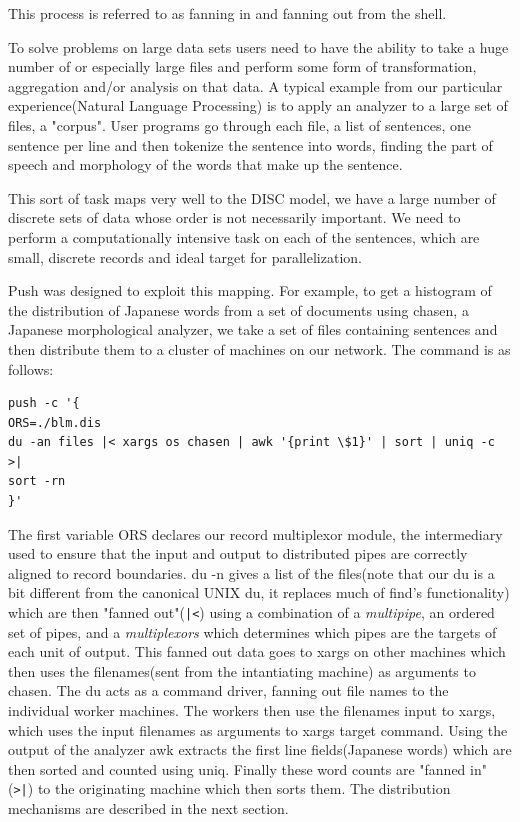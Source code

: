 \documentclass[11pt, letterpaper]{article}
\begin{document}
This process is referred to as fanning in and fanning out from the shell.    

To solve problems on large data sets users need to have the ability to take a huge number of or especially large files and  perform some form of transformation, aggregation and/or analysis on that data.  A typical example from our particular experience(Natural Language Processing) is to apply an analyzer to a large set of files, a "corpus". User programs go through each file, a list of sentences, one sentence per line and then tokenize the sentence into words, finding the part of speech and morphology of the words that make up the sentence.

This sort of task maps very well to the DISC model, we have a large number of discrete sets of data whose order is not necessarily important. We need to perform a computationally intensive task on each of the sentences, which are small, discrete records and ideal target for parallelization. 

Push was designed to exploit this mapping. For example, to get a histogram of the distribution of Japanese words from a set of documents using chasen, a Japanese morphological analyzer, we take a set of files containing sentences and then distribute them to a cluster of machines on our network. The command is as follows:
\begin{verbatim}
push -c '{
ORS=./blm.dis
du -an files |< xargs os chasen | awk '{print \$1}' | sort | uniq -c >|
sort -rn
}'
\end{verbatim}

The first variable ORS declares our record multiplexor module, the intermediary used to ensure that the input and output to distributed pipes are correctly aligned to record boundaries. du -n gives a list of the files(note that our du is a bit different from the canonical UNIX du, it replaces much of find's functionality) which are then "fanned out"(\verb!|<!) using a combination of a \emph{multipipe}, an ordered set of pipes, and a \emph{multiplexors} which determines which pipes are the targets of each unit of output.  This fanned out data goes to xargs\cite{xargsman} on other machines which then uses the filenames(sent from the intantiating machine) as arguments to chasen. The du acts as a command driver, fanning out file names to the individual worker machines. The workers then use the filenames input to xargs, which uses the input filenames as arguments to xargs target command. Using the output of the analyzer awk extracts the first line fields(Japanese words) which are then sorted and counted using uniq.  Finally these word counts are "fanned in"(\verb!>|!) to the originating machine which then sorts them. The distribution mechanisms are described in the next section.
\end{document}
